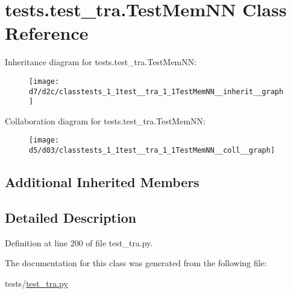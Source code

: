\hypertarget{classtests_1_1test__tra_1_1TestMemNN}{}\section{tests.\+test\+\_\+tra.\+Test\+Mem\+NN Class Reference}
\label{classtests_1_1test__tra_1_1TestMemNN}


Inheritance diagram for tests.\+test\+\_\+tra.\+Test\+Mem\+NN\+:\nopagebreak
\begin{figure}[H]
\begin{center}
\leavevmode
\texttt{[image: d7/d2c/classtests\_1\_1test\_\_tra\_1\_1TestMemNN\_\_inherit\_\_graph]}
\end{center}
\end{figure}


Collaboration diagram for tests.\+test\+\_\+tra.\+Test\+Mem\+NN\+:\nopagebreak
\begin{figure}[H]
\begin{center}
\leavevmode
\texttt{[image: d5/d03/classtests\_1\_1test\_\_tra\_1\_1TestMemNN\_\_coll\_\_graph]}
\end{center}
\end{figure}
\subsection*{Additional Inherited Members}


\subsection{Detailed Description}


Definition at line 200 of file test\+\_\+tra.\+py.



The documentation for this class was generated from the following file\+:\begin{DoxyCompactItemize}
\item 
tests/\hyperlink{test__tra_8py}{test\+\_\+tra.\+py}\end{DoxyCompactItemize}
